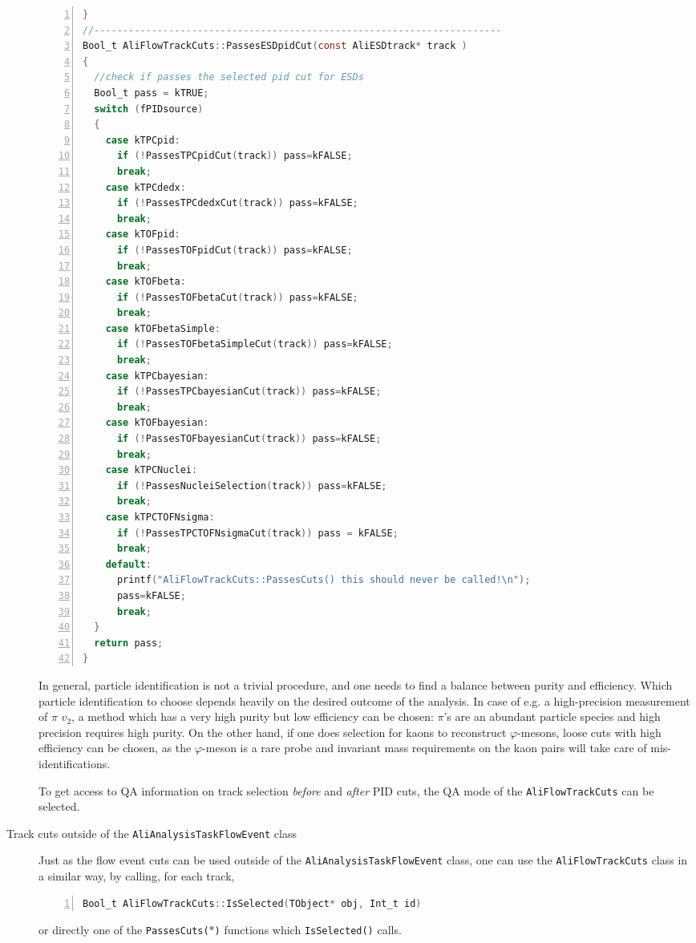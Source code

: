 \documentclass[a4paper]{book}
\numberwithin{equation}{subsection}
\begin{document}
\begin{description}
\begin{lstlisting}[language=C, numbers=left]
}
//-----------------------------------------------------------------------
Bool_t AliFlowTrackCuts::PassesESDpidCut(const AliESDtrack* track )
{
  //check if passes the selected pid cut for ESDs
  Bool_t pass = kTRUE; 
  switch (fPIDsource)    
  {
    case kTPCpid:
      if (!PassesTPCpidCut(track)) pass=kFALSE;
      break;
    case kTPCdedx:
      if (!PassesTPCdedxCut(track)) pass=kFALSE;
      break;
    case kTOFpid:
      if (!PassesTOFpidCut(track)) pass=kFALSE;
      break;
    case kTOFbeta:
      if (!PassesTOFbetaCut(track)) pass=kFALSE;
      break;
    case kTOFbetaSimple:
      if (!PassesTOFbetaSimpleCut(track)) pass=kFALSE;
      break;
    case kTPCbayesian:
      if (!PassesTPCbayesianCut(track)) pass=kFALSE;
      break;
    case kTOFbayesian:
      if (!PassesTOFbayesianCut(track)) pass=kFALSE;
      break;
    case kTPCNuclei:
      if (!PassesNucleiSelection(track)) pass=kFALSE;
      break;
    case kTPCTOFNsigma:
      if (!PassesTPCTOFNsigmaCut(track)) pass = kFALSE;
      break;
    default:
      printf("AliFlowTrackCuts::PassesCuts() this should never be called!\n");
      pass=kFALSE;
      break;
  }
  return pass;
}\end{lstlisting}
In general, particle identification is not a trivial procedure, and one needs to find a balance between purity and efficiency. Which particle identification to choose depends heavily on the desired outcome of the analysis. In case of e.g. a high-precision measurement of $\pi$ $v_2$, a method which has a very high purity but low efficiency can be chosen: $\pi$'s are an abundant particle species and high precision requires high purity. On the other hand, if one does selection for kaons to reconstruct $\varphi$-mesons, loose cuts with high efficiency can be chosen, as the $\varphi$-meson is a rare probe and invariant mass requirements on the kaon pairs will take care of mis-identifications. 

To get access to QA information on track selection \emph{before} and \emph{after} PID cuts, the QA mode of the \texttt{AliFlowTrackCuts} can be selected.

\item[Track cuts outside of the \texttt{AliAnalysisTaskFlowEvent} class] Just as the flow event cuts can be used outside of the \texttt{AliAnalysisTaskFlowEvent} class, one can use the \texttt{AliFlowTrackCuts} class in a similar way, by calling, for each track,
\begin{lstlisting}[language=C, numbers=left]
Bool_t AliFlowTrackCuts::IsSelected(TObject* obj, Int_t id)\end{lstlisting}
or directly one of the \texttt{PassesCuts($\ast$)} functions which \texttt{IsSelected()} calls. 
\end{description}
\end{document}
